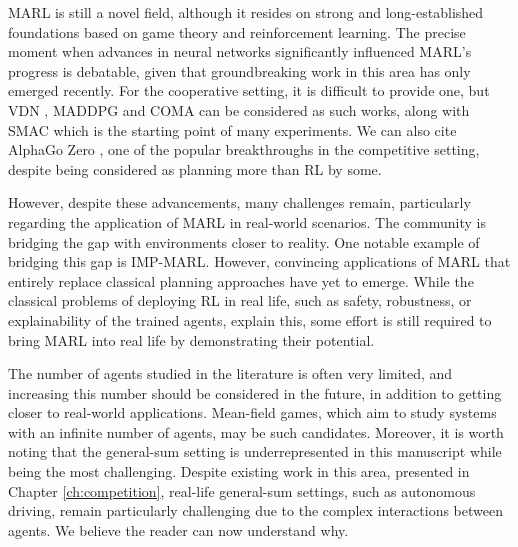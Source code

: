 MARL is still a novel field, although it resides on strong and long-established foundations based on game theory and reinforcement learning.
The precise moment when advances in neural networks significantly influenced MARL's progress is debatable, given that groundbreaking work in this area has only emerged recently.
For the cooperative setting, it is difficult to provide one, but VDN \citep{sunehag2018vdn}, MADDPG \cite{lowe2017multi} and COMA \citep{foerster2017coma} can be considered as such works, along with SMAC \citep{samvelyan2019starcraft} which is the starting point of many experiments.
We can also cite AlphaGo Zero \citep{silver2017mastering}, one of the popular breakthroughs in the competitive setting, despite being considered as planning more than RL by some.

However, despite these advancements, many challenges remain, particularly regarding the application of MARL in real-world scenarios.
The community is bridging the gap with environments closer to reality.
One notable example of bridging this gap is IMP-MARL.
However, convincing applications of MARL that entirely replace classical planning approaches have yet to emerge.
While the classical problems of deploying RL in real life, such as safety, robustness, or explainability of the trained agents, explain this, some effort is still required to bring MARL into real life by demonstrating their potential.

The number of agents studied in the literature is often very limited, and increasing this number should be considered in the future, in addition to getting closer to real-world applications.
Mean-field games, which aim to study systems with an infinite number of agents, may be such candidates.
Moreover, it is worth noting that the general-sum setting is underrepresented in this manuscript while being the most challenging.
Despite existing work in this area, presented in Chapter \ref{ch:competition}, real-life general-sum settings, such as autonomous driving, remain particularly challenging due to the complex interactions between agents.
We believe the reader can now understand why.

